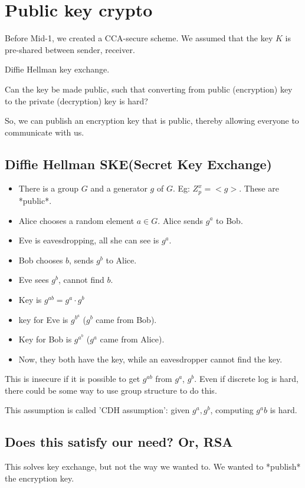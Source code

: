 \section{Public key crypto}

Before Mid-1, we created a CCA-secure scheme.
We assumed that the key $K$ is pre-shared between sender, receiver.

Diffie Hellman key exchange.


Can the key be made public, such that converting from public (encryption) key to the
private (decryption) key is hard?

So, we can publish an encryption key that is public, thereby allowing everyone to
communicate with us.


\subsection{Diffie Hellman SKE(Secret Key Exchange)}
\begin{itemize}
\item There is a group $G$ and a generator $g$ of $G$. Eg: $Z_p^x = <g>$. These are *public*.
\item Alice chooses a random element $a \in G$. Alice sends $g^a$ to Bob.
\item Eve is eavesdropping, all she can see is $g^a$.
\item Bob chooses $b$, sends $g^b$ to Alice.
\item Eve sees $g^b$, cannot find $b$.
\item Key is $g^{ab} = g^a \cdot g^b$
\item key for Eve is $g^{b^a}$ ($g^b$ came from Bob).
\item Key for Bob is $g^{a^b}$ ($g^a$ came from Alice).
\item Now, they both have the key, while an eavesdropper cannot find the key.
\end{itemize}

This is insecure if it is possible to get $g^{ab}$ from $g^a$, $g^b$. Even if discrete log is
hard, there could be some way to use group structure to do this.

This assumption is called 'CDH assumption': given $g^a, g^b$, computing $g^ab$ is hard.


\subsection{Does this satisfy our need? Or, RSA}
This solves key exchange, but not the way we wanted to. We wanted to *publish* the encryption key.

